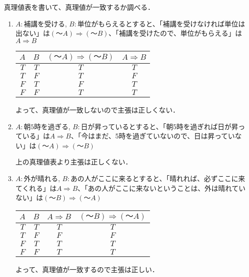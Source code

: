 \documentclass[a4paper,12pt]{ltjsarticle}
\begin{document}
\section{}
真理値表を書いて、真理値が一致するか調べる．
\begin{enumerate}[(1)]
    \item $A : 補講を受ける$, $B : 単位がもらえる$とすると、「補講を受けなければ単位は出ない」は$(〜A) \Rightarrow (〜B)$、「補講を受けたので、単位がもらえる」は$A \Rightarrow B$

        \begin{table}[htbp]
            \centering
            \begin{tabular}{ c|c|c|c }
                $A$ & $B$ & $(〜A) \Rightarrow (〜B)$ & $A \Rightarrow B$ \\
                \hline
                $T$ & $T$ & $T$ & $T$ \\
                $T$ & $F$ & $T$ & $F$ \\
                $F$ & $T$ & $F$ & $T$ \\
                $F$ & $F$ & $T$ & $T$
            \end{tabular}
        \end{table}
        よって、真理値が一致しないので主張は正しくない．
    \item $A : 朝5時を過ぎる$, $B : 日が昇っている$とすると、「朝5時を過ぎれば日が昇っている」は$A \Rightarrow B$、「今はまだ、5時を過ぎていないので、日は昇っていない」は$(〜A) \Rightarrow (〜B)$

        上の真理値表より主張は正しくない．
    \item $A : 外が晴れる$, $B : あの人がここに来る$とすると、「晴れれば、必ずここに来てくれる」は$A \Rightarrow B$、「あの人がここに来ないということは、外は晴れていない」は$(〜B) \Rightarrow (〜A)$

        \begin{table}[htbp]
            \centering
            \begin{tabular}{ c|c|c|c }
                $A$ & $B$ & $A \Rightarrow B$ & $(〜B) \Rightarrow (〜A)$ \\
                \hline
                $T$ & $T$ & $T$ & $T$ \\
                $T$ & $F$ & $F$ & $F$ \\
                $F$ & $T$ & $T$ & $T$ \\
                $F$ & $F$ & $T$ & $T$
            \end{tabular}
        \end{table}
        よって、真理値が一致するので主張は正しい．
\end{enumerate}
\end{document}
